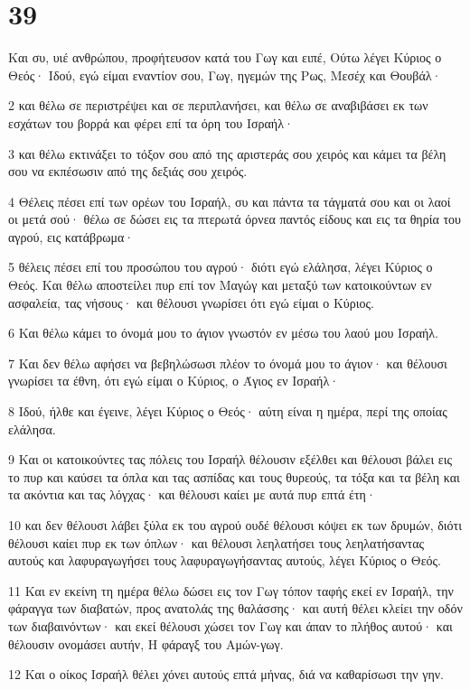 \chapter{39}

\par Και συ, υιέ ανθρώπου, προφήτευσον κατά του Γωγ και ειπέ, Ούτω λέγει Κύριος ο Θεός· Ιδού, εγώ είμαι εναντίον σου, Γωγ, ηγεμών της Ρως, Μεσέχ και Θουβάλ·
\par 2 και θέλω σε περιστρέψει και σε περιπλανήσει, και θέλω σε αναβιβάσει εκ των εσχάτων του βορρά και φέρει επί τα όρη του Ισραήλ·
\par 3 και θέλω εκτινάξει το τόξον σου από της αριστεράς σου χειρός και κάμει τα βέλη σου να εκπέσωσιν από της δεξιάς σου χειρός.
\par 4 Θέλεις πέσει επί των ορέων του Ισραήλ, συ και πάντα τα τάγματά σου και οι λαοί οι μετά σού· θέλω σε δώσει εις τα πτερωτά όρνεα παντός είδους και εις τα θηρία του αγρού, εις κατάβρωμα·
\par 5 θέλεις πέσει επί του προσώπου του αγρού· διότι εγώ ελάλησα, λέγει Κύριος ο Θεός. Και θέλω αποστείλει πυρ επί τον Μαγώγ και μεταξύ των κατοικούντων εν ασφαλεία, τας νήσους· και θέλουσι γνωρίσει ότι εγώ είμαι ο Κύριος.
\par 6 Και θέλω κάμει το όνομά μου το άγιον γνωστόν εν μέσω του λαού μου Ισραήλ.
\par 7 Και δεν θέλω αφήσει να βεβηλώσωσι πλέον το όνομά μου το άγιον· και θέλουσι γνωρίσει τα έθνη, ότι εγώ είμαι ο Κύριος, ο Άγιος εν Ισραήλ·
\par 8 Ιδού, ήλθε και έγεινε, λέγει Κύριος ο Θεός· αύτη είναι η ημέρα, περί της οποίας ελάλησα.
\par 9 Και οι κατοικούντες τας πόλεις του Ισραήλ θέλουσιν εξέλθει και θέλουσι βάλει εις το πυρ και καύσει τα όπλα και τας ασπίδας και τους θυρεούς, τα τόξα και τα βέλη και τα ακόντια και τας λόγχας· και θέλουσι καίει με αυτά πυρ επτά έτη·
\par 10 και δεν θέλουσι λάβει ξύλα εκ του αγρού ουδέ θέλουσι κόψει εκ των δρυμών, διότι θέλουσι καίει πυρ εκ των όπλων· και θέλουσι λεηλατήσει τους λεηλατήσαντας αυτούς και λαφυραγωγήσει τους λαφυραγωγήσαντας αυτούς, λέγει Κύριος ο Θεός.
\par 11 Και εν εκείνη τη ημέρα θέλω δώσει εις τον Γωγ τόπον ταφής εκεί εν Ισραήλ, την φάραγγα των διαβατών, προς ανατολάς της θαλάσσης· και αυτή θέλει κλείει την οδόν των διαβαινόντων· και εκεί θέλουσι χώσει τον Γωγ και άπαν το πλήθος αυτού· και θέλουσιν ονομάσει αυτήν, Η φάραγξ του Αμών-γωγ.
\par 12 Και ο οίκος Ισραήλ θέλει χόνει αυτούς επτά μήνας, διά να καθαρίσωσι την γην.
